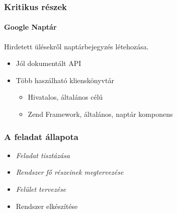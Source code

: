 \documentclass[11pt]{beamer}
\begin{document}
\begin{frame}
    \frametitle{Kritikus részek}
    \framesubtitle{Google Naptár}
    
    Hirdetett ülésekről naptárbejegyzés létehozása.
    
    \begin{itemize}
        \item Jól dokumentált API
        \item Több haszálható klienskönyvtár\\
        \begin{itemize}
        	\item Hivatalos, általános célú
        	\item Zend Framework, általános, naptár komponens
        \end{itemize}            
    \end{itemize}
\end{frame}

\begin{frame}
    \frametitle{A feladat állapota}
    
    \begin{itemize}
        \item \emph{Feladat tisztázása}
        \item \emph{Rendszer fő részeinek megtervezése}
        \item \emph{Felület tervezése}
        \item Rendszer elkészítése
    \end{itemize}
\end{frame}
\end{document}
